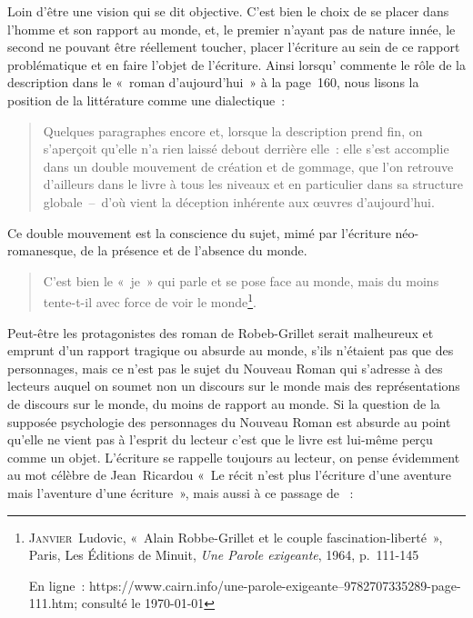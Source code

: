 \documentclass[12pt, a4paper]{article}
\begin{document}
Loin d'être une vision qui se dit objective. C'est bien le choix de se placer dans l'homme et son rapport au monde, et, le premier n'ayant pas de nature innée, le second ne pouvant être réellement toucher, placer l'écriture au sein de ce rapport problématique et en faire l'objet de l'écriture. Ainsi lorsqu'\robbe{} commente le rôle de la description dans le «~roman d'aujourd'hui~» à la page~160, nous lisons la position de la littérature comme une dialectique~:
\begin{quote}
Quelques paragraphes encore et, lorsque la description prend fin, on s’aperçoit qu’elle n’a rien laissé debout derrière elle~: elle s’est accomplie dans un double mouvement de création et de gommage, que l’on retrouve d’ailleurs dans le livre à tous les niveaux et en particulier dans sa structure globale~–~d’où vient la déception inhérente aux œuvres d’aujourd’hui.
\end{quote}
Ce double mouvement est la conscience du sujet, mimé par l'écriture néo-romanesque, de la présence et de l'absence du monde.
\begin{quote}
     C’est bien le «~je~» qui parle et se pose face au monde, mais du moins tente-t-il avec force de voir le monde\footnote{\textsc{Janvier}~Ludovic, «~Alain Robbe-Grillet et le couple fascination-liberté~», Paris, Les Éditions de Minuit, \textit{Une Parole exigeante}, 1964, p.~111-145

En ligne~: https://www.cairn.info/une-parole-exigeante--9782707335289-page-111.htm; consulté le \today}.
\end{quote}
Peut-être les protagonistes des roman de Robeb-Grillet serait malheureux et emprunt d'un rapport tragique ou absurde au monde, s'ils n'étaient pas que des personnages, mais ce n'est pas le sujet du Nouveau Roman qui s'adresse à des lecteurs auquel on soumet non un discours sur le monde mais des représentations de discours sur le monde, du moins de rapport au monde. Si la question de la supposée psychologie des personnages du Nouveau Roman est absurde au point qu'elle ne vient pas à l'esprit du lecteur c'est que le livre est lui-même perçu comme un objet. L'écriture se rappelle toujours au lecteur, on pense évidemment au mot célèbre de Jean~Ricardou «~Le récit n'est plus l'écriture d'une aventure mais l'aventure d'une écriture~», mais aussi à ce passage de \punr~:
\end{document}
